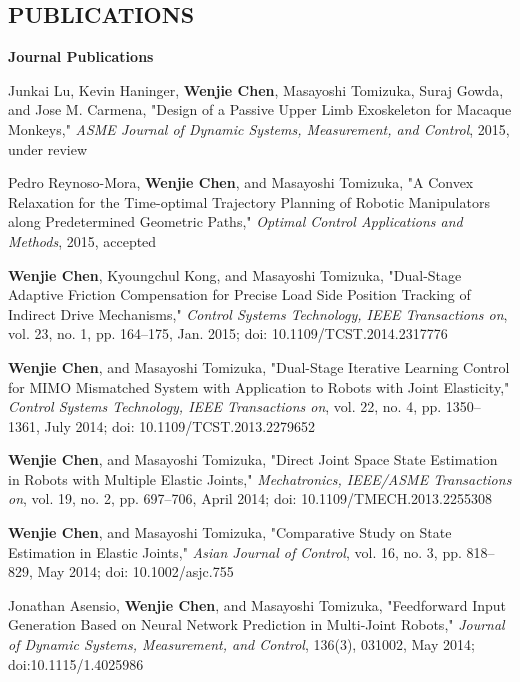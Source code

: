 \documentclass{res}
\begin{document}
\begin{resume}
\section{PUBLICATIONS}
\vspace{0.1in}
    \textbf{Journal Publications} %
    \begin{etaremune}[start=7]
    \item Junkai Lu, Kevin Haninger, \textbf{Wenjie Chen}, Masayoshi Tomizuka, Suraj Gowda, and Jose M. Carmena, "Design of a Passive Upper Limb Exoskeleton for Macaque Monkeys," \emph{ASME Journal of Dynamic Systems, Measurement, and Control}, 2015, under review
    \item Pedro Reynoso-Mora, \textbf{Wenjie Chen}, and Masayoshi Tomizuka, "A Convex Relaxation for the Time-optimal Trajectory Planning of Robotic Manipulators along Predetermined Geometric Paths," \emph{Optimal Control Applications and Methods}, 2015, accepted
    \item \textbf{Wenjie Chen}, Kyoungchul Kong, and Masayoshi Tomizuka, "Dual-Stage Adaptive Friction Compensation for Precise Load Side Position Tracking of Indirect Drive Mechanisms," \emph{Control Systems Technology, IEEE Transactions on}, vol. 23, no. 1, pp. 164--175, Jan. 2015;  doi: 10.1109/TCST.2014.2317776
    \item \textbf{Wenjie Chen}, and Masayoshi Tomizuka, "Dual-Stage Iterative Learning Control for MIMO Mismatched System with Application to Robots with Joint Elasticity," \emph{Control Systems Technology, IEEE Transactions on}, vol. 22, no. 4, pp. 1350--1361, July 2014; doi: 10.1109/TCST.2013.2279652
    \item \textbf{Wenjie Chen}, and Masayoshi Tomizuka, "Direct Joint Space State Estimation in Robots with Multiple Elastic Joints," \emph{Mechatronics, IEEE/ASME Transactions on}, vol. 19, no. 2, pp. 697--706, April 2014; doi: 10.1109/TMECH.2013.2255308
    \item \textbf{Wenjie Chen}, and Masayoshi Tomizuka, "Comparative Study on State Estimation in Elastic Joints," \emph{Asian Journal of Control}, vol. 16, no. 3, pp. 818--829, May 2014; doi: 10.1002/asjc.755%
    \item Jonathan Asensio, \textbf{Wenjie Chen}, and Masayoshi Tomizuka, "Feedforward Input Generation Based on Neural Network Prediction in Multi-Joint Robots," \emph{Journal of Dynamic Systems, Measurement, and Control}, 136(3), 031002, May 2014;   doi:10.1115/1.4025986
    \end{etaremune}


\end{resume}
\end{document}
